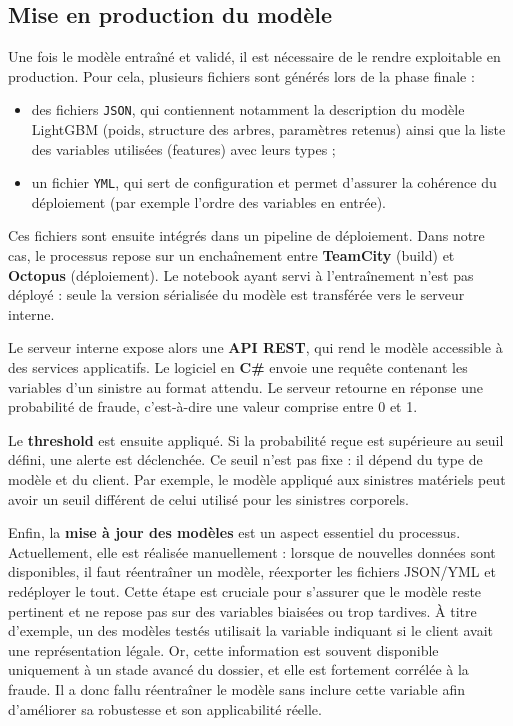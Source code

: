 \documentclass [twoside,openright,a4paper,11pt,french] {report}
\begin{document}
\subsection{Mise en production du modèle}

Une fois le modèle entraîné et validé, il est nécessaire de le rendre exploitable en production. 
Pour cela, plusieurs fichiers sont générés lors de la phase finale :  

\begin{itemize}
    \item des fichiers \texttt{JSON}, qui contiennent notamment la description du modèle LightGBM 
    (poids, structure des arbres, paramètres retenus) ainsi que la liste des variables utilisées (features) avec leurs types ;  
    \item un fichier \texttt{YML}, qui sert de configuration et permet d'assurer la cohérence du déploiement 
    (par exemple l'ordre des variables en entrée).  
\end{itemize}

Ces fichiers sont ensuite intégrés dans un pipeline de déploiement. 
Dans notre cas, le processus repose sur un enchaînement entre \textbf{TeamCity} (build) et \textbf{Octopus} (déploiement). 
Le notebook ayant servi à l'entraînement n'est pas déployé : seule la version sérialisée du modèle est transférée vers le serveur interne.  

Le serveur interne expose alors une \textbf{API REST}, qui rend le modèle accessible à des services applicatifs. 
Le logiciel en \textbf{C\#} envoie une requête contenant les variables d'un sinistre au format attendu. 
Le serveur retourne en réponse une probabilité de fraude, c'est-à-dire une valeur comprise entre 0 et 1.  

Le \textbf{threshold} est ensuite appliqué. 
Si la probabilité reçue est supérieure au seuil défini, une alerte est déclenchée. 
Ce seuil n'est pas fixe : il dépend du type de modèle et du client. 
Par exemple, le modèle appliqué aux sinistres matériels peut avoir un seuil différent de celui utilisé pour les sinistres corporels.  

Enfin, la \textbf{mise à jour des modèles} est un aspect essentiel du processus. 
Actuellement, elle est réalisée manuellement : lorsque de nouvelles données sont disponibles, il faut réentraîner un modèle, 
réexporter les fichiers JSON/YML et redéployer le tout. 
Cette étape est cruciale pour s'assurer que le modèle reste pertinent et ne repose pas sur des variables biaisées ou trop tardives. 
À titre d'exemple, un des modèles testés utilisait la variable indiquant si le client avait une représentation légale. 
Or, cette information est souvent disponible uniquement à un stade avancé du dossier, et elle est fortement corrélée à la fraude. 
Il a donc fallu réentraîner le modèle sans inclure cette variable afin d'améliorer sa robustesse et son applicabilité réelle.  
\end{document}

